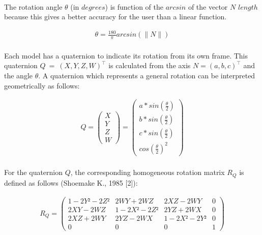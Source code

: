 \documentclass[12pt]{report}
\newcommand{\norm}[1]{\lVert#1\rVert}
\begin{document}
\paragraph{}
The rotation angle $\theta$ (in $degrees$) is function of the $arcsin$ of the vector $N$ $length$ because this gives a better accuracy for the user than a linear function.

\begin{gather}
\theta = \frac{180}{\pi} arcsin(\norm{N})
\label{equ:angle}
\end{gather}

\paragraph{}
Each model has a quaternion to indicate its rotation from its own frame. This quaternion $Q~=~(X,Y,Z,W)^{\top}$ is calculated from the axis $N=(a,b,c)^{\top}$ and the angle $\theta$. A quaternion which represents a general rotation can be interpreted geometrically as follows: 

\begin{align}
Q = \left( \begin{array}{cc}
X \\
Y \\
Z \\
W \end{array} \right)
= \left( \begin{array}{cc}
a * sin\left(\frac{\theta}{2}\right) \\
b * sin\left(\frac{\theta}{2}\right) \\
c * sin\left(\frac{\theta}{2}\right) \\
cos\left(\frac{\theta}{2}\right)^{2} \end{array} \right)
\end{align}

\paragraph{}
	For the quaternion $Q$, the corresponding homogeneous rotation matrix $R_Q$ is defined as follows (Shoemake K., 1985 [2]):

\begin{align}
R_Q = \begin{pmatrix}
1-2Y²-2Z²& 2WY+2WZ& 2XZ-2WY& 0\\
2XY-2WZ& 1-2X²-2Z²& 2YZ+2WX& 0\\
2XZ+2WY& 2YZ-2WX& 1-2X²-2Y²& 0\\
0& 0& 0& 1
\end{pmatrix}
\end{align}
\end{document}
